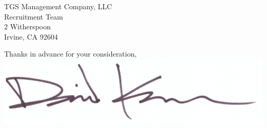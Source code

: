 \documentclass{letter}
\begin{document}
\begin{letter}{
  TGS Management Company, LLC \\
  Recruitment Team \\
  2 Witherspoon \\
  Irvine, CA 92604
}
\closing{
  Thanks in advance for your consideration, \\
  \vspace{.33in}
  \includegraphics[scale=0.33]{signature.png}
}

\end{letter}
\end{document}
